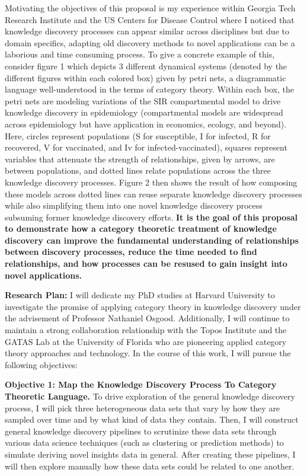 \documentclass[11pt]{extarticle}
\begin{document}
Motivating the objectives of this proposal is my experience within Georgia Tech Research Institute and the US Centers for Disease Control where I noticed that knowledge discovery processes can appear similar across disciplines but due to domain specifics, adapting old discovery methods to novel applications can be a laborious and time consuming process. 
To give a concrete example of this, consider figure 1 which depicts 3 different dynamical systems (denoted by the different figures within each colored box) given by petri nets, a diagrammatic language well-understood in the terms of category theory. %
Within each box, the petri nets are modeling variations of the SIR compartmental model to drive knowledge discovery in epidemiology (compartmental models are widespread across epidemiology but have application in economics, ecology, and beyond). 
Here, circles represent populations (S for susceptible, I for infected, R for recovered, V for vaccinated, and Iv for infected-vaccinated), squares represent variables that attenuate the strength of relationships, given by arrows, are between populations, and dotted lines relate populations across the three knowledge discovery processes.
Figure 2 then shows the result of how composing these models across dotted lines can reuse separate knowledge discovery processes while also simplifying them into one novel knowledge discovery process subsuming former knowledge discovery efforts.
\textbf{It is the goal of this proposal to demonstrate how a category theoretic treatment of knowledge discovery can improve the fundamental understanding of relationships between discovery processes, reduce the time needed to find relationships, and how processes can be resused to gain insight into novel applications.}

\textbf{Research Plan:} I will dedicate my PhD studies at Harvard University to investigate the promise of applying category theory in knowledge discovery under the advisement of Professor Nathaniel Osgood.
Additionally, I will continue to maintain a strong collaboration relationship with the Topos Institute and the GATAS Lab at the University of Florida who are pioneering applied category theory approaches and technology.
In the course of this work, I will pursue the following objectives:

\textbf{Objective 1: Map the Knowledge Discovery Process To Category Theoretic Language.} To drive exploration of the general knowledge discovery process, I will pick three heterogeneous data sets that vary by how they are sampled over time and by what kind of data they contain. 
Then, I will construct general knowledge discovery pipelines to scrutinize these data sets through various data science techniques (such as clustering or prediction methods) to simulate deriving novel insights data in general.
After creating these pipelines, I will then explore manually how these data sets could be related to one another.
\end{document}

